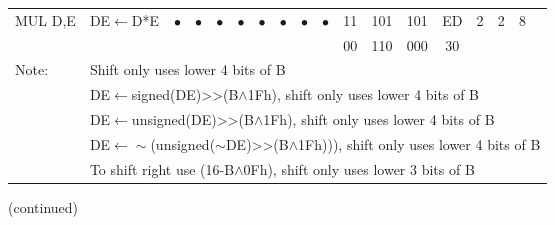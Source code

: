 \documentclass[oneside,a4paper]{book}
\begin{document}
{\begin{tabular}{llcccccccccccccccl}
		MUL D,E\instrt & 
			DE$\leftarrow$D*E & 
			$\bullet$ & 
				$\bullet$ & 
				$\bullet$ & 
				$\bullet$ & 
				$\bullet$ & 
				$\bullet$ & 
				$\bullet$ & 
				$\bullet$ &
			11 & 101 & 101 & 
			ED & 2 &
			2 & 8 & \\
			\multicolumn{10}{c}{} & 00 & 110 & 000 & 30 & \instrb \\

		\hline

		Note:
			& \multicolumn{17}{l}{\parbox{12cm}{\footnotemark[1] Shift only uses lower 4 bits of B}}\notet \\

			& \multicolumn{17}{l}{\parbox{12cm}{\footnotemark[2] DE$\leftarrow$signed(DE)>>(B$\wedge$1Fh), shift only uses lower 4 bits of B}} \\

			& \multicolumn{17}{l}{\parbox{12cm}{\footnotemark[3] DE$\leftarrow$unsigned(DE)>>(B$\wedge$1Fh), shift only uses lower 4 bits of B}} \\

			& \multicolumn{17}{l}{\parbox{12cm}{\footnotemark[4] DE$\leftarrow\sim$(unsigned($\sim$DE)>>(B$\wedge$1Fh))), shift only uses lower 4 bits of B}} \\

			& \multicolumn{17}{l}{\parbox{12cm}{\footnotemark[5] To shift right use (16-B$\wedge$0Fh), shift only uses lower 3 bits of B}}\noteb \\

		\hline

	\end{tabular}
}

(continued)\\
\end{document}
